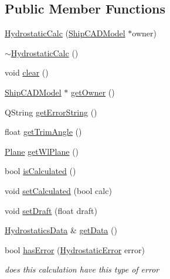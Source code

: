\subsection*{Public Member Functions}
\begin{DoxyCompactItemize}
\item 
\hyperlink{classShipCAD_1_1HydrostaticCalc_a56877acf4c33b3cab96ce381217c7a3b}{Hydrostatic\-Calc} (\hyperlink{classShipCAD_1_1ShipCADModel}{Ship\-C\-A\-D\-Model} $\ast$owner)
\item 
\hyperlink{classShipCAD_1_1HydrostaticCalc_a382835ae6396b82371b605d662fd1696}{$\sim$\-Hydrostatic\-Calc} ()
\item 
void \hyperlink{classShipCAD_1_1HydrostaticCalc_a09403d93ebe095a41b6a29ba9b740b65}{clear} ()
\item 
\hyperlink{classShipCAD_1_1ShipCADModel}{Ship\-C\-A\-D\-Model} $\ast$ \hyperlink{classShipCAD_1_1HydrostaticCalc_af8e8d247720b9c9f2fe972ffd293622d}{get\-Owner} ()
\item 
Q\-String \hyperlink{classShipCAD_1_1HydrostaticCalc_a013287ed3253b83f8fb59499b5d315d2}{get\-Error\-String} ()
\item 
float \hyperlink{classShipCAD_1_1HydrostaticCalc_aafeb5f9407ac6852db5c9ec5e9ad3651}{get\-Trim\-Angle} ()
\item 
\hyperlink{classShipCAD_1_1Plane}{Plane} \hyperlink{classShipCAD_1_1HydrostaticCalc_ac9cefaad770c509cc8b6074efe53b98f}{get\-Wl\-Plane} ()
\item 
bool \hyperlink{classShipCAD_1_1HydrostaticCalc_a875b9708e91db4a8f06ddbcc8a22d830}{is\-Calculated} ()
\item 
void \hyperlink{classShipCAD_1_1HydrostaticCalc_a0deeafff07f3bb77184df959bbd91266}{set\-Calculated} (bool calc)
\item 
void \hyperlink{classShipCAD_1_1HydrostaticCalc_a6528fe532bbb1121c73972906d108835}{set\-Draft} (float draft)
\item 
\hyperlink{structShipCAD_1_1HydrostaticsData}{Hydrostatics\-Data} \& \hyperlink{classShipCAD_1_1HydrostaticCalc_aabcae04d59358b87b9d5fb4ffda83f1a}{get\-Data} ()
\item 
bool \hyperlink{classShipCAD_1_1HydrostaticCalc_ad7c148428c589c5cf063cac7cb27f2af}{has\-Error} (\hyperlink{namespaceShipCAD_a48b5202490cd6d86939d57c867837c0f}{Hydrostatic\-Error} error)
\begin{DoxyCompactList}\small\item\em does this calculation have this type of error \end{DoxyCompactList}\item 

\end{DoxyCompactItemize}
